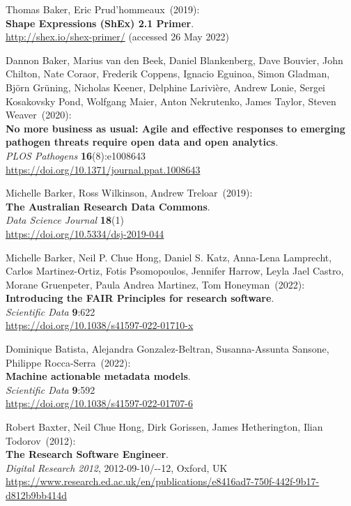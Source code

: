 \begin{thebibliography}{9}
Thomas Baker, Eric Prud'hommeaux~(2019): \\
\textbf{Shape {Expressions} ({ShEx}) 2.1 {Primer}}. \\
\url{http://shex.io/shex-primer/} (accessed 26 May 2022)

Dannon Baker, Marius van den Beek, Daniel Blankenberg, Dave Bouvier, John Chilton, Nate Coraor, Frederik Coppens, Ignacio Eguinoa, Simon Gladman, Björn Grüning, Nicholas Keener, Delphine Larivière, Andrew Lonie, Sergei Kosakovsky Pond, Wolfgang Maier, Anton Nekrutenko, James Taylor, Steven Weaver~(2020): \\
\textbf{No more business as usual: Agile and effective responses to emerging pathogen threats require open data and open analytics}.\\
\emph{PLOS Pathogens} \textbf{16}(8):e1008643 \\
\url{https://doi.org/10.1371/journal.ppat.1008643}

Michelle Barker, Ross Wilkinson, Andrew Treloar~(2019): \\
\textbf{The Australian Research Data Commons}.\\
\emph{Data Science Journal} \textbf{18}(1) \\
\url{https://doi.org/10.5334/dsj-2019-044}

Michelle Barker, Neil P. Chue Hong, Daniel S. Katz, Anna-Lena Lamprecht, Carlos Martinez-Ortiz, Fotis Psomopoulos, Jennifer Harrow, Leyla Jael Castro, Morane Gruenpeter, Paula Andrea Martinez, Tom Honeyman~(2022):\\
\textbf{Introducing the FAIR Principles for research software}.\\
\emph{Scientific Data} \textbf{9}:622 \\
\url{https://doi.org/10.1038/s41597-022-01710-x}

Dominique Batista, Alejandra Gonzalez-Beltran, Susanna-Assunta Sansone, Philippe Rocca-Serra~(2022): \\
\textbf{Machine actionable metadata models}.\\
\emph{Scientific Data} \textbf{9}:592 \\
\url{https://doi.org/10.1038/s41597-022-01707-6}

Robert Baxter, Neil Chue Hong, Dirk Gorissen, James Hetherington, Ilian Todorov~(2012): \\
\textbf{The Research Software Engineer}.\\
\emph{Digital Research 2012}, 2012-09-10/-{}-12, Oxford, UK\\
\url{https://www.research.ed.ac.uk/en/publications/e8416ad7-750f-442f-9b17-d812b9bb414d}


\end{thebibliography}

